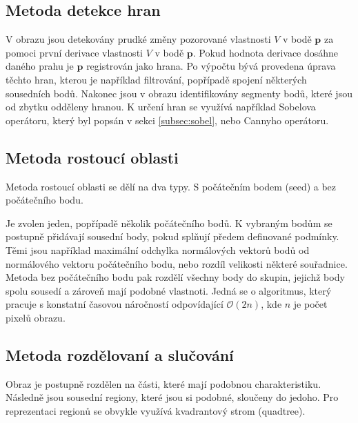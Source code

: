\documentclass[twoside]{ctuthesis}
\newcommand{\tl}[1]{$\mathbf{#1}$}
\begin{document}
\subsection{Metoda detekce hran}
V obrazu jsou detekovány prudké změny pozorované vlastnosti $V$ v bodě \tl{p} za pomoci první derivace vlastnosti $V$ v bodě \tl{p}. Pokud hodnota derivace dosáhne daného prahu je \tl{p} registrován jako hrana. Po výpočtu bývá provedena úprava těchto hran, kterou je například filtrování, popřípadě spojení některých sousedních bodů. Nakonec jsou v obrazu identifikovány segmenty bodů, které jsou od zbytku odděleny hranou. K určení hran se využívá například Sobelova operátoru, který byl popsán v sekci \ref{subsec:sobel}, nebo Cannyho operátoru.\cite{single_RGBD_reconstruction}

\subsection{ Metoda rostoucí oblasti}
Metoda rostoucí oblasti se dělí na dva typy. S počátečním bodem (seed) a bez počátečního bodu. 

        Je zvolen jeden, popřípadě několik počátečního bodů. K vybraným bodům se postupně přidávají sousední body, pokud splňují předem definované podmínky. Těmi jsou například maximální odchylka normálových vektorů bodů od normálového vektoru počátečního bodu, nebo rozdíl velikosti některé souřadnice. Metoda bez počátečního bodu pak rozdělí všechny body do skupin, jejichž body spolu sousedí a zároveň mají podobné vlastnoti. Jedná se o algoritmus, který pracuje s konstatní časovou náročností odpovídající $\mathcal{O} (2n)$, kde $n$ je počet pixelů obrazu. \cite{trevor2013efficient, holz2011real}

\subsection{Metoda rozdělovaní a slučování}
Obraz je postupně rozdělen na části, které mají podobnou charakteristiku. Následně jsou sousední regiony, které jsou si podobné, sloučeny do jedoho. Pro reprezentaci regionů se obvykle využívá kvadrantový strom (quadtree).
\end{document}
